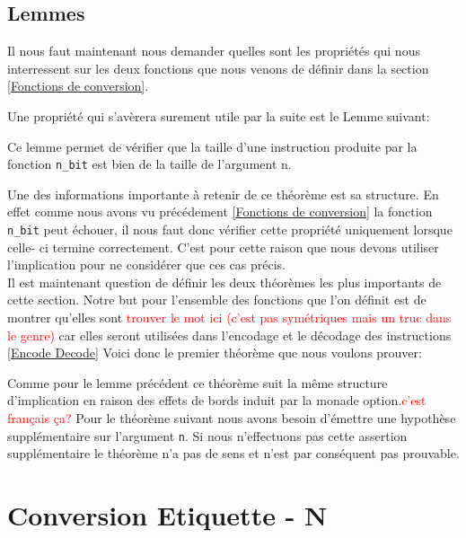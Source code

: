 \documentclass {article}
\newcommand{\codefrom}[3]
           {}
\theoremstyle{definition}
\theoremstyle{remark}
\newcommand{\todo}[1]{\textcolor{red}{#1}}
\newcommand{\fun}[1]{\lstinline!#1!}
\begin{document}
\subsection{Lemmes}

Il nous faut maintenant nous demander quelles sont les propriétés qui nous interressent sur
les deux fonctions que nous venons de définir dans la section \ref{Fonctions de conversion}.

Une propriété qui s'avèrera surement utile par la suite est le Lemme suivant:

\codefrom{src}{binary}{size_n_bit}

Ce lemme permet de vérifier que la taille d'une instruction produite par
la fonction \fun{n_bit} est bien de la taille de l'argument n.


Une des informations importante à retenir de ce théorème est sa structure.
En effet comme nous avons vu précédement \ref{Fonctions de conversion} la
fonction \fun{n_bit} peut échouer, il nous faut donc vérifier cette propriété
uniquement lorsque celle- ci termine correctement. C'est pour cette raison
que nous devons utiliser l'implication pour ne considérer que ces cas précis. \\

Il est maintenant question de définir les deux théorèmes les plus importants de
cette section. Notre but pour l'ensemble des fonctions que l'on définit est de
montrer qu'elles sont \todo{trouver le mot ici (c'est pas symétriques mais un truc dans le genre)}
car elles seront utilisées dans l'encodage et le décodage des instructions \ref{Encode Decode}
Voici donc le premier théorème que nous voulons prouver:

\codefrom{src}{binary}{nbitn}

Comme pour le lemme précédent ce théorème suit la même structure d'implication en raison des effets
de bords induit par la monade option.\todo{c'est français ça?}
Pour le théorème suivant nous avons besoin d'émettre une hypothèse supplémentaire sur l'argument
\fun{n}. Si nous n'effectuons pas cette assertion supplémentaire le
théorème n'a pas de sens et n'est par conséquent pas prouvable.

\codefrom{src}{binary}{bitnbit}





\section{Conversion Etiquette - N}
\label{partieOpcode}
\end{document}
